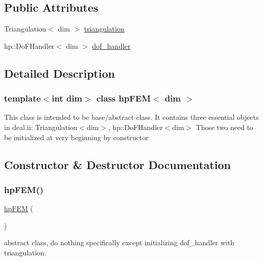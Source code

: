 \subsection*{Public Attributes}
\begin{DoxyCompactItemize}
\item 
Triangulation$<$ dim $>$ \mbox{\hyperlink{classhp_f_e_m_a1e604d1e68926caf1ebc67d2a7451783}{triangulation}}
\item 
hp\+::\+Do\+F\+Handler$<$ dim $>$ \mbox{\hyperlink{classhp_f_e_m_ab4df20fb431f370878adc06e19280d62}{dof\+\_\+handler}}
\end{DoxyCompactItemize}


\subsection{Detailed Description}
\subsubsection*{template$<$int dim$>$\newline
class hp\+F\+E\+M$<$ dim $>$}

This class is intended to be base/abstract class. It contains three essential objects in deal.\+ii\+: {\ttfamily Triangulation$<$dim$>$}, {\ttfamily hp\+::\+Do\+F\+Handler$<$dim$>$} Those two need to be initialized at very beginning by constructor 

\subsection{Constructor \& Destructor Documentation}
\mbox{\label{classhp_f_e_m_ac1540fdd371c0b89a90809251b618025}} 
\subsubsection{\texorpdfstring{hpFEM()}{hpFEM()}}
{\footnotesize\ttfamily \mbox{\hyperlink{classhp_f_e_m}{hp\+F\+EM}} (\begin{DoxyParamCaption}{ }\end{DoxyParamCaption})}

abstract class, do nothing specifically except initializing dof\+\_\+handler with triangulation. \mbox{\label{classhp_f_e_m_acf426058508649734ee9618b5c9148c1}} 
